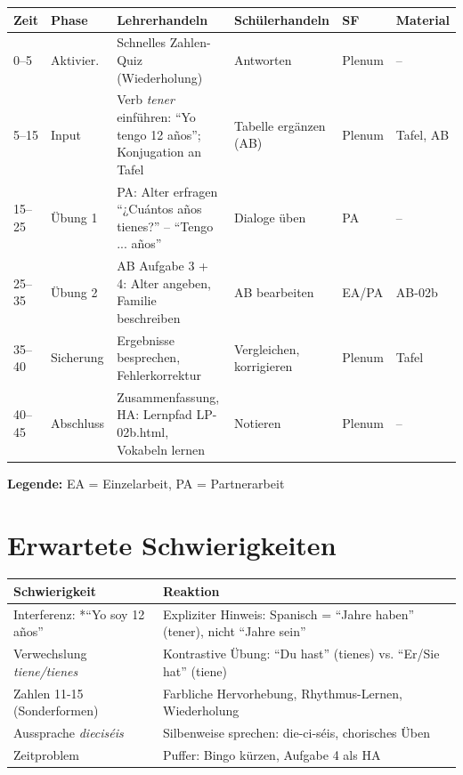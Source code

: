 \documentclass[11pt,a4paper]{article}
\begin{document}
\begin{longtable}{|p{1cm}|p{1.5cm}|p{4cm}|p{3cm}|p{1.5cm}|p{2cm}|}
\hline
\textbf{Zeit} & \textbf{Phase} & \textbf{Lehrerhandeln} & \textbf{Schülerhandeln} & \textbf{SF} & \textbf{Material} \\
\hline
\endhead

0--5 & Aktivier. & Schnelles Zahlen-Quiz (Wiederholung) & Antworten & Plenum & -- \\
\hline

5--15 & Input & Verb \textit{tener} einführen: ``Yo tengo 12 años''; Konjugation an Tafel & Tabelle ergänzen (AB) & Plenum & Tafel, AB \\
\hline

15--25 & Übung 1 & PA: Alter erfragen ``¿Cuántos años tienes?'' -- ``Tengo ... años'' & Dialoge üben & PA & -- \\
\hline

25--35 & Übung 2 & AB Aufgabe 3 + 4: Alter angeben, Familie beschreiben & AB bearbeiten & EA/PA & AB-02b \\
\hline

35--40 & Sicherung & Ergebnisse besprechen, Fehlerkorrektur & Vergleichen, korrigieren & Plenum & Tafel \\
\hline

40--45 & Abschluss & Zusammenfassung, HA: Lernpfad LP-02b.html, Vokabeln lernen & Notieren & Plenum & -- \\
\hline
\end{longtable}

\textbf{Legende:} EA = Einzelarbeit, PA = Partnerarbeit

\section{Erwartete Schwierigkeiten}

\begin{tabular}{|p{4.5cm}|p{8cm}|}
\hline
\textbf{Schwierigkeit} & \textbf{Reaktion} \\
\hline
Interferenz: *``Yo soy 12 años'' & Expliziter Hinweis: Spanisch = ``Jahre haben'' (tener), nicht ``Jahre sein'' \\
\hline
Verwechslung \textit{tiene/tienes} & Kontrastive Übung: ``Du hast'' (tienes) vs. ``Er/Sie hat'' (tiene) \\
\hline
Zahlen 11-15 (Sonderformen) & Farbliche Hervorhebung, Rhythmus-Lernen, Wiederholung \\
\hline
Aussprache \textit{dieciséis} & Silbenweise sprechen: die-ci-séis, chorisches Üben \\
\hline
Zeitproblem & Puffer: Bingo kürzen, Aufgabe 4 als HA \\
\hline
\end{tabular}
\end{document}
